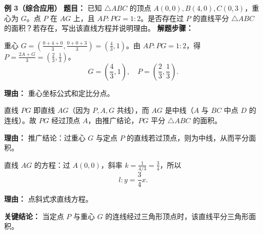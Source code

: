 \begin{examplebox}
	\medskip
	\textbf{\textcolor{CExample}{例 3（综合应用）}}
	\textbf{\textcolor{CExample}{题目：}}
	已知 $\triangle ABC$ 的顶点 $A(0,0), B(4,0), C(0,3)$，重心为 $G$。点 $P$ 在 $AG$ 上，且 $AP:PG=1:2$。是否存在过 $P$ 的直线平分 $\triangle ABC$ 的面积？若存在，写出该直线方程并说明理由。
	\textbf{\textcolor{CExample}{解题步骤：}}
	\begin{description}[style=nextline, leftmargin=2.8em, labelsep=0.5em, itemsep=0.45em]
		\item[\textbf{第一步（求重心及点P）：}]
			重心 $G=\left(\frac{0+4+0}{3},\frac{0+0+3}{3}\right)=\left(\frac43,1\right)$。由 $AP:PG=1:2$，得 $P=\frac{2A+G}{3}=\left(\frac23,\frac13\right)$。
			\[
				G=\left(\frac43,1\right),\quad P=\left(\frac23,\frac13\right).
			\]
			\par\textbf{理由：} 重心坐标公式和定比分点。
		\item[\textbf{第二步（判断PG是否过顶点）：}]
			直线 $PG$ 即直线 $AG$（因为 $P,A,G$ 共线），而 $AG$ 是中线（$A$ 与 $BC$ 中点 $D$ 的连线）。故 $PG$ 经过顶点 $A$，由推广结论，$PG$ 平分 $\triangle ABC$ 的面积。
			\par\textbf{理由：} 推广结论：过重心 $G$ 与定点 $P$ 的直线若过顶点，则为中线，从而平分面积。
		\item[\textbf{第三步（写出直线方程）：}]
			直线 $AG$ 的方程：过 $A(0,0)$，斜率 $k=\frac{1}{4/3}=\frac34$，所以
			\[
				l: y=\frac34 x.
			\]
			\par\textbf{理由：} 点斜式求直线方程。
	\end{description}
	\textbf{\textcolor{CExample}{关键结论：}}
	当定点 $P$ 与重心 $G$ 的连线经过三角形顶点时，该直线平分三角形面积。
\end{examplebox}
